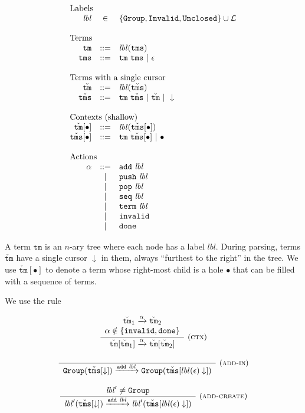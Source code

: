 \documentclass{article}
\newcommand{\typerule}[3]{\frac{\begin{array}{c}#2\end{array}}{\begin{array}{c}#3\end{array}}{~\small\mbox{(\textsc{#1})}}}
\newcommand{\labelFont}{\texttt}
\newcommand{\lbl}{\ensuremath{\mathit{lbl}}}
\newcommand{\Group}{\ensuremath{\labelFont{Group}}}
\newcommand{\Invalid}{\ensuremath{\labelFont{Invalid}}}
\newcommand{\Unclosed}{\ensuremath{\labelFont{Unclosed}}}
\newcommand{\tm}{\ensuremath{\mathtt{tm}}}
\newcommand{\tms}{\ensuremath{\mathtt{tms}}}
\newcommand{\Tm}{\ensuremath{\check{\tm}}}
\newcommand{\Tms}{\ensuremath{\check{\tms}}}
\newcommand{\action}{\ensuremath{\alpha}}
\newcommand{\add}[1]{\ensuremath{\texttt{add}~#1}}
\newcommand{\push}[1]{\ensuremath{\texttt{push}~#1}}
\newcommand{\pop}[1]{\ensuremath{\texttt{pop}~#1}}
\newcommand{\seq}[1]{\ensuremath{\texttt{seq}~#1}}
\newcommand{\term}[1]{\ensuremath{\texttt{term}~#1}}
\newcommand{\invalid}{\ensuremath{\texttt{invalid}}}
\newcommand{\done}{\ensuremath{\texttt{done}}}
\newcommand{\cursor}{\ensuremath{\downarrow}}
\newcommand{\steps}[1]{\ensuremath{\xrightarrow{#1}}}
\newcommand{\arrayheading}[2]{\multicolumn{#1}{l}{\mbox{#2}}}
\begin{document}
\[
  \begin{array}{rcl}
    \arrayheading{3}{Labels}\\
    \lbl & \in & \{\Group, \Invalid, \Unclosed\}\cup \mathcal{L} \\
    \\
    \arrayheading{3}{Terms}\\
    \tm  & ::= & \lbl(\tms) \\
    \tms & ::= & \tm ~ \tms ~|~ \epsilon \\
    \\
    \arrayheading{3}{Terms with a single cursor}\\
    \Tm  & ::= & \lbl(\Tms)\\
    \Tms & ::= & \tm ~ \Tms ~|~ \Tm ~|~ \cursor\\
    \\
    \arrayheading{3}{Contexts (shallow)}\\
    \Tm[\bullet] & ::= & \lbl(\Tms[\bullet])\\
    \Tms[\bullet] & ::= & \tm ~ \Tms[\bullet] ~|~ \bullet\\
    \\
    \arrayheading{3}{Actions}\\
    \action & ::= & \add{\lbl}\\
            & ~|~ & \push{\lbl}\\
            & ~|~ & \pop{\lbl}\\
            & ~|~ & \seq{\lbl}\\
            & ~|~ & \term{\lbl}\\
            & ~|~ & \invalid\\
            & ~|~ & \done\\
  \end{array}
\]

A term \tm{} is an $n$-ary tree where each node has a label \lbl{}.
%
During parsing, terms \Tm{} have a single cursor \cursor{} in them,
always ``furthest to the right'' in the tree.
%
We use $\Tm[\bullet]$ to denote a term whose right-most child is a
hole $\bullet$ that can be filled with a sequence of terms.

We use the rule

\[
\typerule{ctx}{
\Tm_1 \steps{\action} \Tm_2\\
\action \notin \{\invalid, \done\}
}{
\Tm[\Tm_1] \steps{\action} \Tm[\Tm_2]
}
\]

\[
  \begin{array}{c}
    \typerule{add-in}{}{
    \Group(\Tms[\cursor]) \steps{\add{\lbl}} \Group(\Tms[lbl(\epsilon) \cursor])
    }\\\\
    \typerule{add-create}{
    \lbl' \neq \Group
    }{
    \lbl'(\Tms[\cursor]) \steps{\add{\lbl}} \lbl'(\Tms[\lbl(\epsilon) \cursor])
    }
  \end{array}
\]
\end{document}
